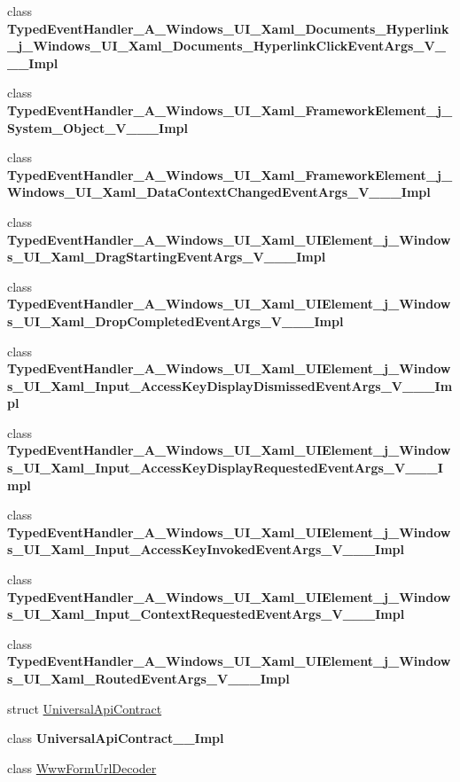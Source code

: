 \begin{DoxyCompactItemize}
\item 
class {\bfseries Typed\+Event\+Handler\+\_\+\+A\+\_\+\+Windows\+\_\+\+U\+I\+\_\+\+Xaml\+\_\+\+Documents\+\_\+\+Hyperlink\+\_\+j\+\_\+\+Windows\+\_\+\+U\+I\+\_\+\+Xaml\+\_\+\+Documents\+\_\+\+Hyperlink\+Click\+Event\+Args\+\_\+\+V\+\_\+\+\_\+\+\_\+\+Impl}
\item 
class {\bfseries Typed\+Event\+Handler\+\_\+\+A\+\_\+\+Windows\+\_\+\+U\+I\+\_\+\+Xaml\+\_\+\+Framework\+Element\+\_\+j\+\_\+\+System\+\_\+\+Object\+\_\+\+V\+\_\+\+\_\+\+\_\+\+Impl}
\item 
class {\bfseries Typed\+Event\+Handler\+\_\+\+A\+\_\+\+Windows\+\_\+\+U\+I\+\_\+\+Xaml\+\_\+\+Framework\+Element\+\_\+j\+\_\+\+Windows\+\_\+\+U\+I\+\_\+\+Xaml\+\_\+\+Data\+Context\+Changed\+Event\+Args\+\_\+\+V\+\_\+\+\_\+\+\_\+\+Impl}
\item 
class {\bfseries Typed\+Event\+Handler\+\_\+\+A\+\_\+\+Windows\+\_\+\+U\+I\+\_\+\+Xaml\+\_\+\+U\+I\+Element\+\_\+j\+\_\+\+Windows\+\_\+\+U\+I\+\_\+\+Xaml\+\_\+\+Drag\+Starting\+Event\+Args\+\_\+\+V\+\_\+\+\_\+\+\_\+\+Impl}
\item 
class {\bfseries Typed\+Event\+Handler\+\_\+\+A\+\_\+\+Windows\+\_\+\+U\+I\+\_\+\+Xaml\+\_\+\+U\+I\+Element\+\_\+j\+\_\+\+Windows\+\_\+\+U\+I\+\_\+\+Xaml\+\_\+\+Drop\+Completed\+Event\+Args\+\_\+\+V\+\_\+\+\_\+\+\_\+\+Impl}
\item 
class {\bfseries Typed\+Event\+Handler\+\_\+\+A\+\_\+\+Windows\+\_\+\+U\+I\+\_\+\+Xaml\+\_\+\+U\+I\+Element\+\_\+j\+\_\+\+Windows\+\_\+\+U\+I\+\_\+\+Xaml\+\_\+\+Input\+\_\+\+Access\+Key\+Display\+Dismissed\+Event\+Args\+\_\+\+V\+\_\+\+\_\+\+\_\+\+Impl}
\item 
class {\bfseries Typed\+Event\+Handler\+\_\+\+A\+\_\+\+Windows\+\_\+\+U\+I\+\_\+\+Xaml\+\_\+\+U\+I\+Element\+\_\+j\+\_\+\+Windows\+\_\+\+U\+I\+\_\+\+Xaml\+\_\+\+Input\+\_\+\+Access\+Key\+Display\+Requested\+Event\+Args\+\_\+\+V\+\_\+\+\_\+\+\_\+\+Impl}
\item 
class {\bfseries Typed\+Event\+Handler\+\_\+\+A\+\_\+\+Windows\+\_\+\+U\+I\+\_\+\+Xaml\+\_\+\+U\+I\+Element\+\_\+j\+\_\+\+Windows\+\_\+\+U\+I\+\_\+\+Xaml\+\_\+\+Input\+\_\+\+Access\+Key\+Invoked\+Event\+Args\+\_\+\+V\+\_\+\+\_\+\+\_\+\+Impl}
\item 
class {\bfseries Typed\+Event\+Handler\+\_\+\+A\+\_\+\+Windows\+\_\+\+U\+I\+\_\+\+Xaml\+\_\+\+U\+I\+Element\+\_\+j\+\_\+\+Windows\+\_\+\+U\+I\+\_\+\+Xaml\+\_\+\+Input\+\_\+\+Context\+Requested\+Event\+Args\+\_\+\+V\+\_\+\+\_\+\+\_\+\+Impl}
\item 
class {\bfseries Typed\+Event\+Handler\+\_\+\+A\+\_\+\+Windows\+\_\+\+U\+I\+\_\+\+Xaml\+\_\+\+U\+I\+Element\+\_\+j\+\_\+\+Windows\+\_\+\+U\+I\+\_\+\+Xaml\+\_\+\+Routed\+Event\+Args\+\_\+\+V\+\_\+\+\_\+\+\_\+\+Impl}
\item 
struct \hyperlink{struct_windows_1_1_foundation_1_1_universal_api_contract}{Universal\+Api\+Contract}
\item 
class {\bfseries Universal\+Api\+Contract\+\_\+\+\_\+\+Impl}
\item 
class \hyperlink{class_windows_1_1_foundation_1_1_www_form_url_decoder}{Www\+Form\+Url\+Decoder}
\end{DoxyCompactItemize}
